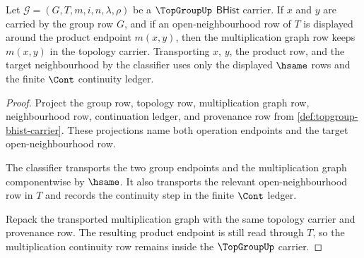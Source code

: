 \begin{theorem}
\label{thm:topgroup-multiplication-continuity-carrier}
Let $\mathcal G=(G,T,m,i,n,\lambda,\rho)$ be a $\TopGroupUp$
$\mathsf{BHist}$ carrier. If $x$ and $y$ are carried by the group row $G$, and
if an open-neighbourhood row of $T$ is displayed around the product endpoint
$m(x,y)$, then the multiplication graph row keeps $m(x,y)$ in the topology
carrier. Transporting $x$, $y$, the product row, and the target neighbourhood
by the classifier uses only the displayed $\hsame$ rows and the finite
$\Cont$ continuity ledger.
\end{theorem}
\begin{proof}
Project the group row, topology row, multiplication graph row,
neighbourhood row, continuation ledger, and provenance row from
\autoref{def:topgroup-bhist-carrier}. These projections name both operation
endpoints and the target open-neighbourhood row.

The classifier transports the two group endpoints and the multiplication graph
componentwise by $\hsame$. It also transports the relevant open-neighbourhood
row in $T$ and records the continuity step in the finite $\Cont$ ledger.

Repack the transported multiplication graph with the same topology carrier and
provenance row. The resulting product endpoint is still read through $T$, so
the multiplication continuity row remains inside the $\TopGroupUp$ carrier.
\end{proof}



